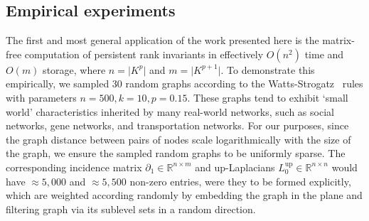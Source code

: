 \documentclass[10pt]{article}
\numberwithin{equation}{section}
\newcommand{\+}{%
	\raisebox{0.18ex}{\scaleobj{0.55}{+}}
}
\theoremstyle{definition}
\theoremstyle{definition}
\begin{document}
\subsection{Empirical experiments}
 The first and most general application of the work presented here is the matrix-free computation of persistent rank invariants in effectively $O(n^2)$ time and $O(m)$ storage, where $n = \lvert K^p \rvert$ and $m = \lvert K^{p+1}\rvert$. 
To demonstrate this empirically, we sampled $30$ random graphs according to the Watts-Strogatz~\cite{} rules with parameters $n=500, k=10, p=0.15$. These graphs tend to exhibit `small world' characteristics inherited by many real-world networks, such as social networks, gene networks, and transportation networks.  
For our purposes, since the graph distance between pairs of nodes scale logarithmically with the size of the graph, we ensure the sampled random graphs to be uniformly sparse. 
The corresponding incidence matrix $\partial_1 \in \mathbb{R}^{n \times m}$ and up-Laplacians $L_0^{\mathrm{up}} \in \mathbb{R}^{n \times n}$ would have $\approx 5,000$ and  $\approx 5,500$ non-zero entries, were they to be formed explicitly, which are weighted according randomly by embedding the graph in the plane and filtering  graph via its sublevel sets in a random direction. 
\end{document}
